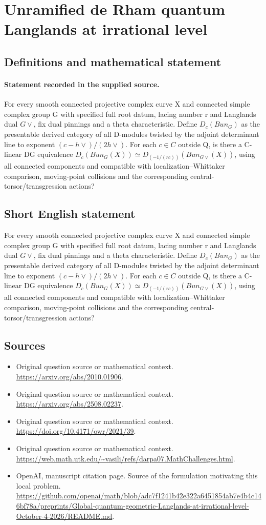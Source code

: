 \documentclass[11pt]{article}
\begin{document}
\section*{Unramified de Rham quantum Langlands at irrational level}\label{30007076}
\subsection{Definitions and mathematical statement}
\paragraph{Statement recorded in the supplied source.}
For every smooth connected projective complex curve X and connected simple complex group G with specified full root datum, lacing number r and Langlands dual $G\vee $, fix dual pinnings and a theta characteristic. Define $D_c(Bun_G)$ as the presentable derived category of all D-modules twisted by the adjoint determinant line to exponent $(c-h\vee )/(2h\vee )$. For each $c\in C$ outside Q, is there a C-linear DG equivalence $D_c(Bun_G(X))\simeq D_(-1/(rc))(Bun_{G\vee }(X))$, using all connected components and compatible with localization–Whittaker comparison, moving-point collisions and the corresponding central-torsor/transgression actions?
\subsection{Short English statement}
For every smooth connected projective complex curve X and connected simple complex group G with specified full root datum, lacing number r and Langlands dual $G\vee $, fix dual pinnings and a theta characteristic. Define $D_c(Bun_G)$ as the presentable derived category of all D-modules twisted by the adjoint determinant line to exponent $(c-h\vee )/(2h\vee )$. For each $c\in C$ outside Q, is there a C-linear DG equivalence $D_c(Bun_G(X))\simeq D_(-1/(rc))(Bun_{G\vee }(X))$, using all connected components and compatible with localization–Whittaker comparison, moving-point collisions and the corresponding central-torsor/transgression actions?
\subsection{Sources}
\begin{itemize}
\item[S1] Original question source or mathematical context.
\url{https://arxiv.org/abs/2010.01906}.
\item[S2] Original question source or mathematical context.
\url{https://arxiv.org/abs/2508.02237}.
\item[S3] Original question source or mathematical context.
\url{https://doi.org/10.4171/owr/2021/39}.
\item[S4] Original question source or mathematical context.
\url{https://web.math.utk.edu/~vasili/refs/darpa07.MathChallenges.html}.
\item[S5] OpenAI, manuscript citation page. Source of the formulation motivating this local problem.
\url{https://github.com/openai/math/blob/adc7f1241b42e322a6451854ab7e4b4c146bf78a/preprints/Global-quantum-geometric-Langlands-at-irrational-level-October-4-2026/README.md}.
\end{itemize}
\end{document}

